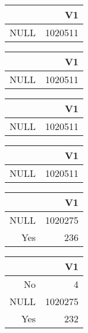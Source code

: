 \bigskip\bigskip
\centering
\begin{tabular}{rr}
  \hline
 & V1 \\ 
  \hline
NULL & 1020511 \\ 
   \hline
\end{tabular}

\bigskip\bigskip
\centering
\begin{tabular}{rr}
  \hline
 & V1 \\ 
  \hline
NULL & 1020511 \\ 
   \hline
\end{tabular}

\bigskip\bigskip
\centering
\begin{tabular}{rr}
  \hline
 & V1 \\ 
  \hline
NULL & 1020511 \\ 
   \hline
\end{tabular}

\bigskip\bigskip
\centering
\begin{tabular}{rr}
  \hline
 & V1 \\ 
  \hline
NULL & 1020511 \\ 
   \hline
\end{tabular}

\bigskip\bigskip
\centering
\begin{tabular}{rr}
  \hline
 & V1 \\ 
  \hline
NULL & 1020275 \\ 
  Yes & 236 \\ 
   \hline
\end{tabular}

\bigskip\bigskip
\centering
\begin{tabular}{rr}
  \hline
 & V1 \\ 
  \hline
No &   4 \\ 
  NULL & 1020275 \\ 
  Yes & 232 \\ 
   \hline
\end{tabular}


